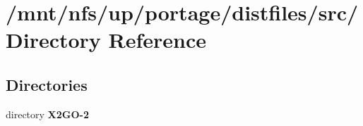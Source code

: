 \section{/mnt/nfs/up/portage/distfiles/src/ Directory Reference}
\label{dir_03f76c8978c5a1b06dfba669c9b63612}
\subsection*{Directories}
\begin{CompactItemize}
\item 
directory \bf{X2GO-2}
\end{CompactItemize}

